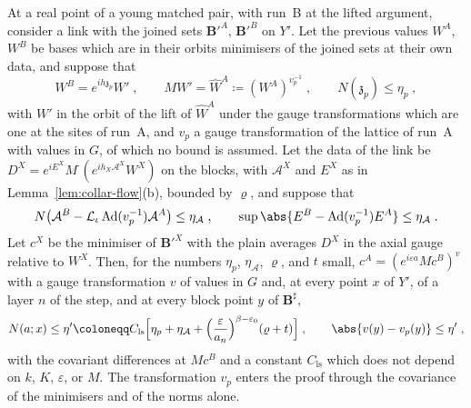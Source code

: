 \begin{proposition}\label{prop:link-step}
At a real point of a young matched pair, with run~B at the lifted argument, consider a link with the joined sets $\mathbf B'^A$, $\mathbf B'^B$ on $Y'$. Let the previous values $W^A$, $W^B$ be bases which are in their orbits minimisers of the joined sets at their own data, and suppose that
\[
    W^B = e^{ih\mathfrak z_p}W'\;,
    \qquad
    MW' = \hat W^A \coloneqq (W^A)^{v_p^{-1}}\;,
    \qquad
    N(\mathfrak z_p) \leq \eta_p\;,
\]
with $W'$ in the orbit of the lift of $\hat W^A$ under the gauge transformations which are one at the sites of run~A, and $v_p$ a gauge transformation of the lattice of run~A with values in $G$, of which no bound is assumed. Let the data of the link be $D^X = e^{iE^X}M^\cdot(e^{ih_X\mathcal A^X}W^X)$ on the blocks, with $\mathcal A^X$ and $E^X$ as in Lemma~\ref{lem:collar-flow}(b), bounded by $\varrho$, and suppose that
\[
    N\bigl(\mathcal A^B - \mathcal L_\iota\operatorname{Ad}(v_p^{-1})\mathcal A^A\bigr) \leq \eta_{\mathcal A}\;,
    \qquad
    \sup\abs{E^B - \operatorname{Ad}(v_p^{-1})E^A} \leq \eta_{\mathcal A}\;.
\]
Let $c^X$ be the minimiser of $\mathbf B'^X$ with the plain averages $D^X$ in the axial gauge relative to $W^X$. Then, for the numbers $\eta_p$, $\eta_{\mathcal A}$, $\varrho$, and $t$ small, $c^A = (e^{i\varepsilon a}Mc^B)^v$ with a gauge transformation $v$ of values in $G$ and, at every point $x$ of $Y'$, of a layer $n$ of the step, and at every block point $y$ of $\mathbf B^\sharp$,
\[
    N(a; x) \leq \eta' \coloneqq C_{\mathrm{ls}}\Bigl[\eta_p + \eta_{\mathcal A} + \Bigl(\frac{\varepsilon}{a_n}\Bigr)^{\beta-\varepsilon_0}(\varrho + t)\Bigr]\;,
    \qquad
    \abs{v(y) - v_p(y)} \leq \eta'\;,
\]
with the covariant differences at $Mc^B$ and a constant $C_{\mathrm{ls}}$ which does not depend on $k$, $K$, $\varepsilon$, or $M$. The transformation $v_p$ enters the proof through the covariance of the minimisers and of the norms alone.
\end{proposition}

